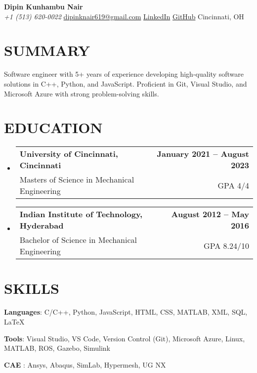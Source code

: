 \documentclass[letterpaper,11pt]{article}
\makeatletter
\newcommand{\resumeSubheading}[4]{
  \vspace{-2pt}\item
    \begin{tabular*}{1.0\textwidth}[t]{l@{\extracolsep{\fill}}r}
      \textbf{{#1}} & \textbf{{\small #2}} \\
      
      {#3} & {\small #4} \\
    \end{tabular*}\vspace{-4pt}
}
\newcommand{\resumeSubHeadingListStart}{\begin{itemize}[leftmargin=0.0in, label={}]}
\newcommand{\resumeSubHeadingListEnd}{\end{itemize}}
\makeatother
\begin{document}
\begin{center}
  {\huge \textbf{Dipin Kunhambu Nair}} \\
  \small \emph{+1 (513) 620-0022} \textbullet \href{mailto:dipinknair619@gmail.com}{dipinknair619@gmail.com} \textbullet
  \href{https://linkedin.com/in/dipinknair619/}{LinkedIn} \textbullet
  \href{https://github.com/dipinknair}{GitHub} \textbullet
  Cincinnati, OH \\
  \vspace{-10pt}
\end{center}

\vspace{-20pt}
\section{SUMMARY}
{Software engineer with 5+ years of experience developing high-quality software solutions in C++, Python, and JavaScript. Proficient in Git, Visual Studio, and Microsoft Azure with strong problem-solving skills.}
\vspace{-10pt}
\section{EDUCATION}
  \resumeSubHeadingListStart
    \resumeSubheading
      {University of Cincinnati, Cincinnati}{January 2021 -- August 2023}
      {Masters of Science in Mechanical Engineering}{GPA 4/4}
  \resumeSubHeadingListEnd
  \vspace{-15pt}
  \resumeSubHeadingListStart
    \resumeSubheading
      {Indian Institute of Technology, Hyderabad}{August 2012 -- May 2016}
      {Bachelor of Science in Mechanical Engineering}{GPA 8.24/10}
  \resumeSubHeadingListEnd
\vspace{-15pt}

\section{SKILLS}
 \begin{itemize}[leftmargin=0.2in]
    \small{\item{
     \textbf{Languages}{: C/C++, Python, JavaScript, HTML, CSS, MATLAB, XML, SQL, \LaTeX }
     \vspace{-5pt}
     \item{\textbf{Tools}{: Visual Studio, VS Code, Version Control (Git), Microsoft Azure, Linux, MATLAB, ROS, Gazebo, Simulink}}
     \vspace{-5pt}
     \item{\textbf{CAE  }{: Ansys, Abaqus, SimLab, Hypermesh, UG NX}}
    }}
 \end{itemize}
 \vspace{-18pt}
\end{document}
